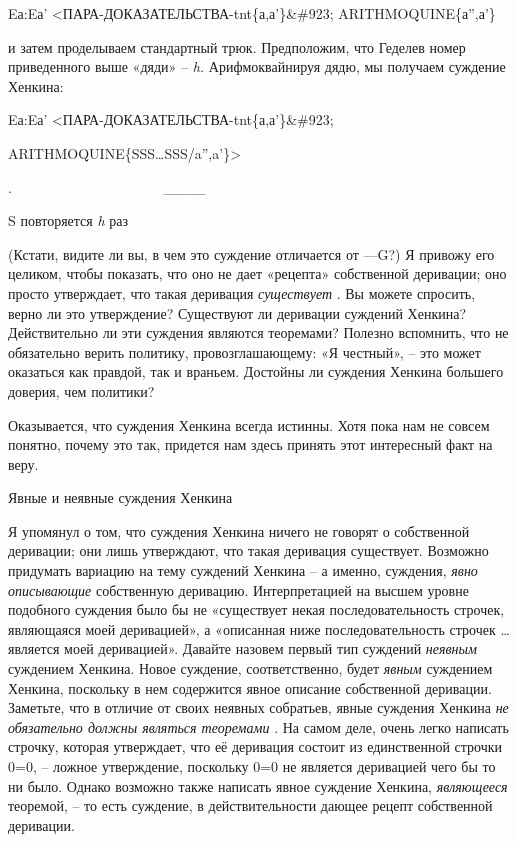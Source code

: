 \documentclass[../main.tex]{subfiles}
\begin{document}
Eа:Eа' \textless ПАРА-ДОКАЗАТЕЛЬСТВА-\acs{tnt}\{а,а'\}\&\#923; ARITHMOQUINE\{а'',а'\}

и затем проделываем стандартный трюк. Предположим, что Геделев номер приведенного выше «дяди» \--- \emph{h.} Арифмоквайнируя дядю, мы получаем суждение Хенкина:

Eа:Eа' \textless ПАРА-ДОКАЗАТЕЛЬСТВА-\acs{tnt}\{а,а'\}\&\#923;

ARITHMOQUINE\{SSS\ldots SSS/a'',a'\}\textgreater{}

.~~~~~~~~~~~~~~~~~~~~~ \textbar\_\_\_\_\textbar{}

S повторяется \emph{h} раз

(Кстати, видите ли вы, в чем это суждение отличается от ---G?) Я привожу его целиком, чтобы показать, что оно не дает «рецепта» собственной деривации; оно просто утверждает, что такая деривация \emph{существует} . Вы можете спросить, верно ли это утверждение? Существуют ли деривации суждений Хенкина? Действительно ли эти суждения являются теоремами? Полезно вспомнить, что не обязательно верить политику, провозглашающему: «Я честный», \--- это может оказаться как правдой, так и враньем. Достойны ли суждения Хенкина большего доверия, чем политики?

Оказывается, что суждения Хенкина всегда истинны. Хотя пока нам не совсем понятно, почему это так, придется нам здесь принять этот интересный факт на веру.

Явные и неявные суждения Хенкина

Я упомянул о том, что суждения Хенкина ничего не говорят о собственной деривации; они лишь утверждают, что такая деривация существует. Возможно придумать вариацию на тему суждений Хенкина \--- а именно, суждения, \emph{явно описывающие} собственную деривацию. Интерпретацией на высшем уровне подобного суждения было бы не «существует некая последовательность строчек, являющаяся моей деривацией», а «описанная ниже последовательность строчек \ldots{} является моей деривацией». Давайте назовем первый тип суждений \emph{неявным} суждением Хенкина. Новое суждение, соответственно, будет \emph{явным} суждением Хенкина, поскольку в нем содержится явное описание собственной деривации. Заметьте, что в отличие от своих неявных собратьев, явные суждения Хенкина \emph{не обязательно должны являться теоремами} . На самом деле, очень легко написать строчку, которая утверждает, что её деривация состоит из единственной строчки 0=0, \--- ложное утверждение, поскольку 0=0 не является деривацией чего бы то ни было. Однако возможно также написать явное суждение Хенкина, \emph{являющееся} теоремой, \--- то есть суждение, в действительности дающее рецепт собственной деривации.
\end{document}
